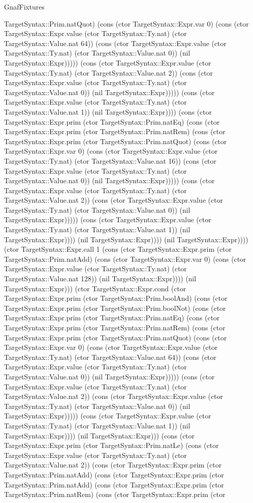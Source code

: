 \begin{lexlean}{GnafFixtures}
\begin{semanticmodule}
{TargetSyntax::Prim.natQuot) (cons (ctor TargetSyntax::Expr.var 0) (cons (ctor TargetSyntax::Expr.value (ctor TargetSyntax::Ty.nat) (ctor TargetSyntax::Value.nat 64)) (cons (ctor TargetSyntax::Expr.value (ctor TargetSyntax::Ty.nat) (ctor TargetSyntax::Value.nat 0)) (nil TargetSyntax::Expr))))) (cons (ctor TargetSyntax::Expr.value (ctor TargetSyntax::Ty.nat) (ctor TargetSyntax::Value.nat 2)) (cons (ctor TargetSyntax::Expr.value (ctor TargetSyntax::Ty.nat) (ctor TargetSyntax::Value.nat 0)) (nil TargetSyntax::Expr))))) (cons (ctor TargetSyntax::Expr.value (ctor TargetSyntax::Ty.nat) (ctor TargetSyntax::Value.nat 1)) (nil TargetSyntax::Expr)))) (cons (ctor TargetSyntax::Expr.prim (ctor TargetSyntax::Prim.natEq) (cons (ctor TargetSyntax::Expr.prim (ctor TargetSyntax::Prim.natRem) (cons (ctor TargetSyntax::Expr.prim (ctor TargetSyntax::Prim.natQuot) (cons (ctor TargetSyntax::Expr.var 0) (cons (ctor TargetSyntax::Expr.value (ctor TargetSyntax::Ty.nat) (ctor TargetSyntax::Value.nat 16)) (cons (ctor TargetSyntax::Expr.value (ctor TargetSyntax::Ty.nat) (ctor TargetSyntax::Value.nat 0)) (nil TargetSyntax::Expr))))) (cons (ctor TargetSyntax::Expr.value (ctor TargetSyntax::Ty.nat) (ctor TargetSyntax::Value.nat 2)) (cons (ctor TargetSyntax::Expr.value (ctor TargetSyntax::Ty.nat) (ctor TargetSyntax::Value.nat 0)) (nil TargetSyntax::Expr))))) (cons (ctor TargetSyntax::Expr.value (ctor TargetSyntax::Ty.nat) (ctor TargetSyntax::Value.nat 1)) (nil TargetSyntax::Expr)))) (nil TargetSyntax::Expr)))) (nil TargetSyntax::Expr)))) (ctor TargetSyntax::Expr.call 1 (cons (ctor TargetSyntax::Expr.prim (ctor TargetSyntax::Prim.natAdd) (cons (ctor TargetSyntax::Expr.var 0) (cons (ctor TargetSyntax::Expr.value (ctor TargetSyntax::Ty.nat) (ctor TargetSyntax::Value.nat 128)) (nil TargetSyntax::Expr)))) (nil TargetSyntax::Expr))) (ctor TargetSyntax::Expr.cond (ctor TargetSyntax::Expr.prim (ctor TargetSyntax::Prim.boolAnd) (cons (ctor TargetSyntax::Expr.prim (ctor TargetSyntax::Prim.boolNot) (cons (ctor TargetSyntax::Expr.prim (ctor TargetSyntax::Prim.natEq) (cons (ctor TargetSyntax::Expr.prim (ctor TargetSyntax::Prim.natRem) (cons (ctor TargetSyntax::Expr.prim (ctor TargetSyntax::Prim.natQuot) (cons (ctor TargetSyntax::Expr.var 0) (cons (ctor TargetSyntax::Expr.value (ctor TargetSyntax::Ty.nat) (ctor TargetSyntax::Value.nat 64)) (cons (ctor TargetSyntax::Expr.value (ctor TargetSyntax::Ty.nat) (ctor TargetSyntax::Value.nat 0)) (nil TargetSyntax::Expr))))) (cons (ctor TargetSyntax::Expr.value (ctor TargetSyntax::Ty.nat) (ctor TargetSyntax::Value.nat 2)) (cons (ctor TargetSyntax::Expr.value (ctor TargetSyntax::Ty.nat) (ctor TargetSyntax::Value.nat 0)) (nil TargetSyntax::Expr))))) (cons (ctor TargetSyntax::Expr.value (ctor TargetSyntax::Ty.nat) (ctor TargetSyntax::Value.nat 1)) (nil TargetSyntax::Expr)))) (nil TargetSyntax::Expr))) (cons (ctor TargetSyntax::Expr.prim (ctor TargetSyntax::Prim.natLe) (cons (ctor TargetSyntax::Expr.value (ctor TargetSyntax::Ty.nat) (ctor TargetSyntax::Value.nat 2)) (cons (ctor TargetSyntax::Expr.prim (ctor TargetSyntax::Prim.natAdd) (cons (ctor TargetSyntax::Expr.prim (ctor TargetSyntax::Prim.natAdd) (cons (ctor TargetSyntax::Expr.prim (ctor TargetSyntax::Prim.natRem) (cons (ctor TargetSyntax::Expr.prim (ctor }
\end{semanticmodule}
\end{lexlean}
